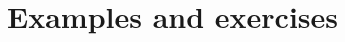 \documentclass[aspectratio=169]{beamer}
\begin{document}


\section{Examples and exercises}
\end{document}
